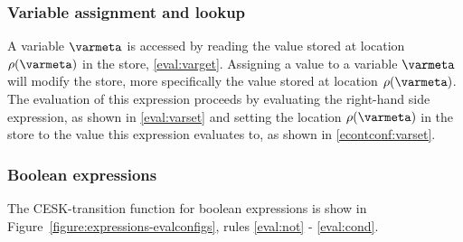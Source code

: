 \documentclass[a4paper,oneside]{article}
\begin{document}
\subsubsection{Variable assignment and lookup}
\label{subsubsec:variable-assignment-and-lookup}

A variable $\varmeta$ is accessed by reading the value stored at location $\env(\varmeta)$ in the store, \eqref{eval:varget}.
Assigning a value to a variable $\varmeta$ will modify the store, more specifically the value stored at location  $\env(\varmeta)$.
The evaluation of this expression proceeds by evaluating the right-hand side expression, as shown in \eqref{eval:varset} and setting the location $\env(\varmeta)$ in the store to the value this expression evaluates to, as shown in \eqref{econtconf:varset}.


\subsubsection{Boolean expressions}
\label{subsubsec:bool-expressions}

The CESK-transition function for boolean expressions is show in Figure~\ref{figure:expressions-evalconfigs}, rules \eqref{eval:not} - \eqref{eval:cond}.
\end{document}

